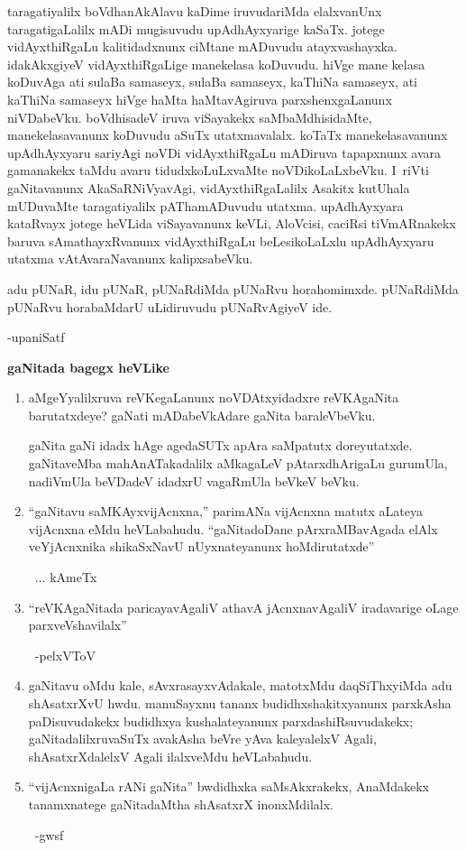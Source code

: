 taragatiyalilx boVdhanAkAlavu kaDime iruvudariMda elalxvanUnx taragatigaLalilx mADi mugisuvudu upAdhAyxyarige kaSaTx. jotege vidAyxthiRgaLu kalitidadxnunx ciMtane mADuvudu atayxvashayxka. idakAkxgiyeV vidAyxthiRgaLige manekelasa koDuvudu. hiVge mane kelasa koDuvAga ati sulaBa samaseyx, sulaBa samaseyx, kaThiNa samaseyx, ati kaThiNa samaseyx hiVge haMta haMtavAgiruva parxshenxgaLanunx niVDabeVku. boVdhisadeV iruva viSayakekx saMbaMdhisidaMte,
manekelasavanunx koDuvudu aSuTx utatxmavalalx. koTaTx manekelasavanunx upAdhAyxyaru sariyAgi noVDi vidAyxthiRgaLu mADiruva tapapxnunx avara gamanakekx taMdu avaru tidudxkoLuLxvaMte noVDikoLaLxbeVku. I~riVti gaNitavanunx AkaSaRNiVyavAgi, vidAyxthiRgaLalilx Asakitx kutUhala mUDuvaMte taragatiyalilx pAThamADuvudu utatxma. upAdhAyxyara kataRvayx jotege heVLida viSayavanunx keVLi, AloVcisi, caciRsi tiVmARnakekx baruva sAmathayxRvanunx vidAyxthiRgaLu beLesikoLaLxlu upAdhAyxyaru utatxma vAtAvaraNavanunx kalipxsabeVku.

adu pUNaR, idu pUNaR, pUNaRdiMda pUNaRvu horahomimxde. pUNaR\-diMda pUNaRvu horabaMdarU uLidiruvudu pUNaRvAgiyeV ide.

\begin{flushright}
-upaniSatf
\end{flushright}

\begin{center}
{\bf gaNitada bagegx heVLike}
\end{center}

\begin{enumerate}[\rm 1]
\item aMgeYyalilxruva reVKegaLanunx noVDAtxyidadxre reVKAgaNita barutatxdeye? gaNati mADabeVkAdare gaNita baraleVbeVku.

gaNita gaNi idadx hAge agedaSUTx apAra saMpatutx doreyutatxde. gaNitaveMba mahAnATakadalilx aMkagaLeV pAtarxdhArigaLu gurumUla, nadiVmUla beVDadeV idadxrU vagaRmUla beVkeV beVku.

\item  ``gaNitavu saMKAyxvijAcnxna,'' parimANa vijAcnxna matutx aLateya vijAcnxna eMdu heVLabahudu. ``gaNitadoDane pArxraMBavAgada elAlx veYjAcnxnika shikaSxNavU nUyxnateyanunx hoMdirutatxde''

~\hfill $\ldots$  kAmeTx

\item ``reVKAgaNitada paricayavAgaliV athavA jAcnxnavAgaliV iradavarige oLage parxveVshavilalx''

~\hfill -pelxVToV

\item gaNitavu oMdu kale, sAvxrasayxvAdakale, matotxMdu daqSiThxyiMda adu shAsatxrXvU hwdu. manuSayxnu tananx budidhxshakitxyanunx parxkAsha paDisuvudakekx budidhxya kushalate\-yanunx parxdashiRsuvudakekx; gaNitadalilxruvaSuTx avakAsha beVre yAva kaleyalelxV Agali, shAsatxrXdalelxV Agali ilalxveMdu heVLabahudu.

\item ``vijAcnxnigaLa rANi gaNita'' bwdidhxka saMsAkxrakekx, AnaMdakekx tanamxnatege gaNitadaMtha shAsatxrX inonxMdilalx.

~\hfill -gwsf

\end{enumerate}


